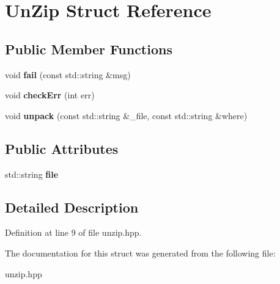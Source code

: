 \hypertarget{struct_un_zip}{\section{Un\-Zip Struct Reference}
\label{struct_un_zip}
}
\subsection*{Public Member Functions}
\begin{DoxyCompactItemize}
\item 
\hypertarget{struct_un_zip_a360f3aedef8bb2ccf0568cfe806eef29}{void {\bfseries fail} (const std\-::string \&msg)}\label{struct_un_zip_a360f3aedef8bb2ccf0568cfe806eef29}

\item 
\hypertarget{struct_un_zip_aa974eb0103450810ff86bbbd5374925a}{void {\bfseries check\-Err} (int err)}\label{struct_un_zip_aa974eb0103450810ff86bbbd5374925a}

\item 
\hypertarget{struct_un_zip_a7b4614f41dcb93da1b21011444b0d16d}{void {\bfseries unpack} (const std\-::string \&\-\_\-file, const std\-::string \&where)}\label{struct_un_zip_a7b4614f41dcb93da1b21011444b0d16d}

\end{DoxyCompactItemize}
\subsection*{Public Attributes}
\begin{DoxyCompactItemize}
\item 
\hypertarget{struct_un_zip_ad6b4ca8cdcf71819383209ef79e3de52}{std\-::string {\bfseries file}}\label{struct_un_zip_ad6b4ca8cdcf71819383209ef79e3de52}

\end{DoxyCompactItemize}


\subsection{Detailed Description}


Definition at line 9 of file unzip.\-hpp.



The documentation for this struct was generated from the following file\-:\begin{DoxyCompactItemize}
\item 
unzip.\-hpp\end{DoxyCompactItemize}
